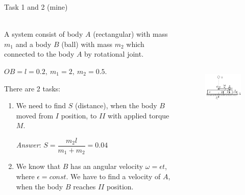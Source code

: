 \documentclass[aspectratio=169]{beamer}
\begin{document}
    \begin{frame}[t]{Task 1 and 2 (mine)}
    \framesubtitle{}
    \begin{columns}[T,onlytextwidth]
        \begin{column}{0.49\textwidth}
\scriptsize
            A system consist of body $A$ (rectangular) with mass $m_1$ and a body $B$ (ball) with mass $m_2$ which connected to the body $A$ by rotational joint. 
            
            $OB=l=0.2,\ m_1 = 2,\ m_2 = 0.5$.
            \bigskip

            There are 2 tasks:
            \begin{enumerate}
                \item We need to find $S$ (distance), when the body $B$ moved from $I$ position, to $II$ with applied torque $M$.
                \bigskip

                \textit{Answer}: $S = \dfrac{m_2 l}{m_1 + m_2} = 0.04$
                \item We know that $B$ has an angular velocity $\omega = \epsilon t$, where $\epsilon=const$. We have to find a velocity of $A$, when the body $B$ reaches $II$ position. 
            \end{enumerate}
        \end{column}
        \begin{column}{0.49\textwidth}
            \begin{figure}[H]
                \centering\includegraphics[height=6cm,width=1\textwidth,keepaspectratio]{image6.png}
                \label{fig:image6.png}
            \end{figure}
        \end{column}
    \end{columns}
    \end{frame}
    
\end{document}
